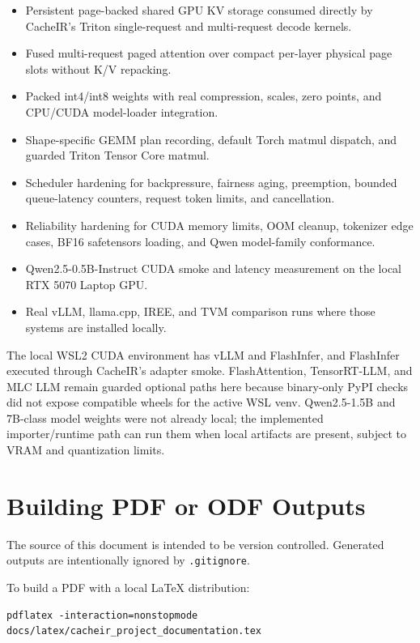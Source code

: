 \documentclass[11pt]{article}
\begin{document}
\begin{itemize}[leftmargin=*]
  \item Persistent page-backed shared GPU KV storage consumed directly by
        CacheIR's Triton single-request and multi-request decode kernels.
  \item Fused multi-request paged attention over compact per-layer physical
        page slots without K/V repacking.
  \item Packed int4/int8 weights with real compression, scales, zero points,
        and CPU/CUDA model-loader integration.
  \item Shape-specific GEMM plan recording, default Torch matmul dispatch, and
        guarded Triton Tensor Core matmul.
  \item Scheduler hardening for backpressure, fairness aging, preemption,
        bounded queue-latency counters, request token limits, and cancellation.
  \item Reliability hardening for CUDA memory limits, OOM cleanup, tokenizer
        edge cases, BF16 safetensors loading, and Qwen model-family conformance.
  \item Qwen2.5-0.5B-Instruct CUDA smoke and latency measurement on the local
        RTX 5070 Laptop GPU.
  \item Real vLLM, llama.cpp, IREE, and TVM comparison runs where those systems
        are installed locally.
\end{itemize}

The local WSL2 CUDA environment has vLLM and FlashInfer, and FlashInfer executed
through CacheIR's adapter smoke. FlashAttention, TensorRT-LLM, and MLC LLM remain
guarded optional paths here because binary-only PyPI checks did not expose
compatible wheels for the active WSL venv. Qwen2.5-1.5B and 7B-class model
weights were not already local; the implemented importer/runtime path can run
them when local artifacts are present, subject to VRAM and quantization limits.

\section{Building PDF or ODF Outputs}

The source of this document is intended to be version controlled. Generated
outputs are intentionally ignored by \texttt{.gitignore}.

To build a PDF with a local LaTeX distribution:

\begin{lstlisting}
pdflatex -interaction=nonstopmode docs/latex/cacheir_project_documentation.tex
\end{lstlisting}
\end{document}

